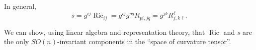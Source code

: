 \documentclass[a4paper]{article}
\DeclareMathOperator{\Ric}{Ric} %
\begin{document}
In general,
\[
  s = g^{ij} \Ric_{ij} = g^{ij} g^{pq} R_{pi, jq} = g^{j k} R^\ell_{j, k \ell}.
\]

We can show, using linear algebra and representation theory, that \(\Ric\) and \(s\) are the only \(SO(n)\)-invariant components in the ``space of curvature tensor''.
























\printindex
\end{document}
